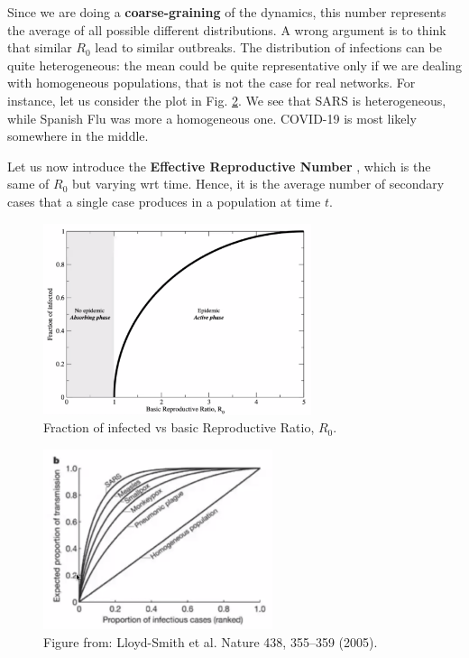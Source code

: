 \documentclass[../main/main.tex]{subfiles}
\begin{document}
Since we are doing a \textbf{coarse-graining} of the dynamics, this number represents the average of all possible different distributions. A wrong argument is to think that similar $R_0$ lead to similar outbreaks. The distribution of infections can be quite heterogeneous: the mean could be quite representative only if we are dealing with homogeneous populations, that is not the case for real networks. For instance, let us consider the plot in Fig. \ref{fig:3_outbreaks}. We see that SARS is heterogeneous, while Spanish Flu was more a homogeneous one. COVID-19 is most likely somewhere in the middle.

Let us now introduce the \textbf{Effective Reproductive Number} , which is the same of $R_0$ but varying wrt time. Hence, it is the average number of secondary cases that a single case produces in a population at time $t$.

\begin{figure}[h!]
\centering
\includegraphics[width=0.7\textwidth]{../lessons/image/02/2_R_0.png}
\caption{\label{fig:2_R_0.png} Fraction of infected vs basic Reproductive Ratio, \( R_0 \).}
\end{figure}

\begin{figure}[h!]
\centering
\includegraphics[width=0.6\textwidth]{../lessons/image/02/3_outbreaks.png}
\caption{\label{fig:3_outbreaks} Figure from: Lloyd-Smith et al. Nature 438, 355–359 (2005).}
\end{figure}
\end{document}
